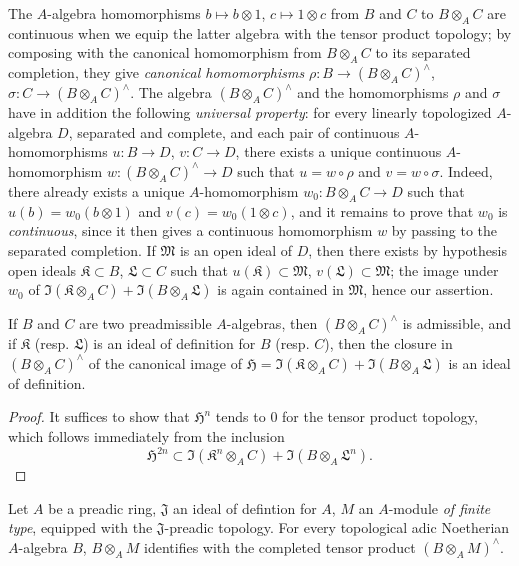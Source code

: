 \begin{env}[7.7.6]
\label{0.7.7.6}
The $A$-algebra homomorphisms $b\mapsto b\otimes 1$, $c\mapsto 1\otimes c$ from $B$ and $C$ to
$B\otimes_A C$ are continuous when we equip the latter algebra with the tensor product topology; by
composing with the canonical homomorphism from $B\otimes_A C$ to its separated completion, they
give \emph{canonical homomorphisms} $\rho:B\to(B\otimes_A C)^\wedge$,
$\sigma:C\to(B\otimes_A C)^\wedge$. The algebra $(B\otimes_A C)^\wedge$ and the homomorphisms
$\rho$ and $\sigma$ have in addition the following \emph{universal property}: for every linearly
topologized $A$-algebra $D$, separated and complete, and each pair of continuous $A$-homomorphisms
$u:B\to D$, $v:C\to D$, there exists a unique continuous $A$-homomorphism
$w:(B\otimes_A C)^\wedge\to D$ such that $u=w\circ\rho$ and $v=w\circ\sigma$. Indeed, there already
exists a unique $A$-homomorphism $w_0:B\otimes_A C\to D$ such that $u(b)=w_0(b\otimes 1)$ and
$v(c)=w_0(1\otimes c)$, and it remains to prove that $w_0$ is \emph{continuous}, since it then gives a
continuous homomorphism $w$ by passing to the separated completion. If $\mathfrak{M}$ is an open
ideal of $D$, then there exists by hypothesis open ideals $\mathfrak{K}\subset B$,
$\mathfrak{L}\subset C$ such that $u(\mathfrak{K})\subset\mathfrak{M}$,
$v(\mathfrak{L})\subset\mathfrak{M}$; the image under $w_0$ of
$\Im(\mathfrak{K}\otimes_A C)+\Im(B\otimes_A\mathfrak{L})$ is again contained in $\mathfrak{M}$,
hence our assertion.
\end{env}

\begin{proposition}[7.7.7]
\label{0.7.7.7}
If $B$ and $C$ are two preadmissible $A$-algebras, then $(B\otimes_A C)^\wedge$ is
admissible, and if $\mathfrak{K}$ (resp. $\mathfrak{L}$) is an ideal of definition for
$B$ (resp. $C$), then the closure in $(B\otimes_A C)^\wedge$ of the canonical image of
$\mathfrak{H}=\Im(\mathfrak{K}\otimes_A C)+\Im(B\otimes_A\mathfrak{L})$ is an ideal of definition.
\end{proposition}

\begin{proof}
\label{proof-0.7.7.7}
It suffices to show that $\mathfrak{H}^n$ tends to $0$ for the tensor product topology, which follows immediately from the inclusion
\[
  \mathfrak{H}^{2n}\subset\Im(\mathfrak{K}^n\otimes_A C)+\Im(B\otimes_A\mathfrak{L}^n).
\]
\end{proof}

\begin{proposition}[7.7.8]
\label{0.7.7.8}
Let $A$ be a preadic ring, $\mathfrak{J}$ an ideal of defintion for $A$, $M$ an $A$-module
\emph{of finite type}, equipped with the $\mathfrak{J}$-preadic topology. For every topological
adic Noetherian $A$-algebra $B$, $B\otimes_A M$ identifies with the completed tensor product
$(B\otimes_A M)^\wedge$.
\end{proposition}


